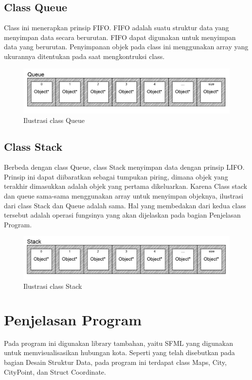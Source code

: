 \documentclass[]{article}
\begin{document}
\subsection{Class Queue}
\par
Class ini menerapkan prinsip FIFO. FIFO adalah suatu struktur data yang menyimpan data secara berurutan. FIFO dapat digunakan untuk menyimpan data yang berurutan. Penyimpanan objek pada class ini menggunakan array yang ukurannya ditentukan pada saat mengkontruksi class.
\begin{figure}[htp]
    \centering
    \includegraphics[width=12cm]{queue.png}
    \caption{Ilustrasi class Queue}
    \label{fig:queue}
\end{figure}
\subsection{Class Stack}
Berbeda dengan class Queue, class Stack menyimpan data dengan prinsip LIFO. Prinsip ini dapat diibaratkan sebagai tumpukan piring, dimana objek yang terakhir dimasukkan adalah objek yang pertama dikeluarkan. Karena Class stack dan queue sama-sama menggunakan array untuk menyimpan objeknya, ilustrasi dari class Stack dan Queue adalah sama.
Hal yang membedakan dari kedua class tersebut adalah operasi fungsinya yang akan dijelaskan pada bagian Penjelasan Program.
\begin{figure}[htp]
    \centering
    \includegraphics[width=12cm]{stack.png}
    \caption{Ilustrasi class Stack}
    \label{fig:stack}
\end{figure}
\pagebreak
\section{Penjelasan Program}
\par
Pada program ini digunakan library tambahan, yaitu SFML yang digunakan untuk memvisualisasikan hubungan kota. Seperti yang telah disebutkan pada bagian Desain Struktur Data,
pada program ini terdapat class Maps, City, CityPoint, dan Struct Coordinate.
\end{document}
